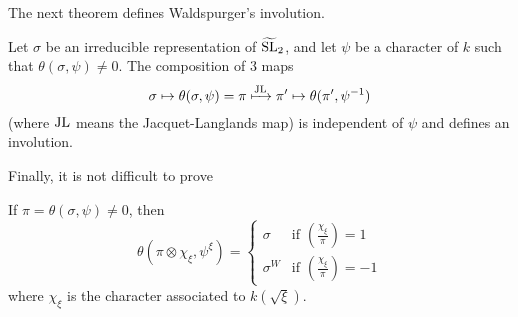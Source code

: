 The next theorem defines Waldspurger's involution.

\begin{theorem}
\label{thm:2.4}
Let $\sigma$ be an irreducible representation of $\widetilde{\mathrm{SL}}_2$, and let $\psi$ be a character of $k$ such that $\theta(\sigma, \psi) \neq 0$.
The composition of 3 maps
\[
    \sigma \mapsto \theta(\sigma, \psi) = \pi \xmapsto{\mathrm{JL}} \pi' \mapsto \theta(\pi', \psi^{-1})
\]
(where $\mathrm{JL}$ means the Jacquet-Langlands map) is independent of $\psi$ and defines an involution.
\end{theorem}

Finally, it is not difficult to prove
\begin{theorem}
\label{thm:2.5}
If $\pi = \theta(\sigma, \psi) \neq 0$, then
\[
\theta(\pi \otimes \chi_\xi, \psi^\xi) = \begin{cases} \sigma & \text{if } \left(\frac{\chi_\xi}{\pi}\right) = 1 \\
\sigma^W & \text{if } \left(\frac{\chi_\xi}{\pi}\right) = -1\end{cases}
\]
where $\chi_\xi$ is the character associated to $k(\sqrt{\xi})$.
\end{theorem}